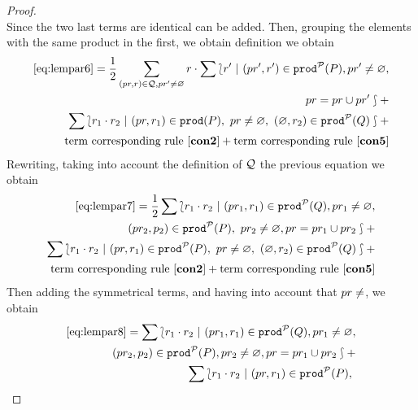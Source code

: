 \begin{proof}
\begin{equation}
    \end{equation}
    Since the two last terms are identical can be added. Then,
    grouping the elements with the same product in the first, we obtain
    definition we obtain
    \begin{equation}\label{eq:lempar7}
      \begin{split}
        \eqref{eq:lempar6} =
        \frac{1}{2}\sum_{(pr,r)\in{\cal Q}, pr'\neq\varnothing} r\cdot
        \sum\lbag r'\ |\
        (pr', r')\in\mathtt{prod}^{\cal P}(P), pr'\neq\varnothing,\\
        pr=pr\cup pr'\rbag +\\
        \sum\lbag  r_{1}\cdot r_{2}\ |\
        (pr,r_{1})\in\mathtt{prod}(P),\ pr\neq\varnothing,\
        (\varnothing, r_{2})\in \mathtt{prod}^{\cal P}(Q)\rbag+\\
        \mbox{term corresponding rule \ensuremath{\mathbf{[con2]}}} + \mbox{term corresponding rule \ensuremath{\mathbf{[con5]}}}
      \end{split}
    \end{equation}
    Rewriting, taking into account the definition of \({\cal Q}\) the
    previous equation we obtain
    \begin{equation}\label{eq:lempar8}
      \begin{split}
        \eqref{eq:lempar7} =
        \frac{1}{2}\sum\lbag r_{1}\cdot r_{2}\ |\ (pr_{1},r_{1})\in\prodp(Q),
        pr_{1}\neq\emptyset,\\ (pr_{2},p_{2})\in\prodp(P),\
        pr_{2}\neq\emptyset,pr = pr_{1}\cup pr_{2}\rbag +\\
        \sum\lbag  r_{1}\cdot r_{2}\ |\
        (pr,r_{1})\in\prodp(P),\ pr\neq\emptyset,\
        (\emptyset,r_{2})\in\prodp(Q)\rbag+\\
        \mbox{term corresponding rule \nombreRegla{con2}} + \mbox{term corresponding rule \nombreRegla{con5}}
      \end{split}
    \end{equation}
    Then adding the symmetrical terms, and having into account that
    $pr\neq\empty$, we obtain
    \begin{equation}\label{eq:lempar9}
      \begin{split}
        \eqref{eq:lempar8} =
        \sum\lbag r_{1}\cdot r_{2}\ |\ (pr_{1},r_{1})\in\prodp(Q),
        pr_{1}\neq\emptyset,\\ (pr_{2},p_{2})\in\prodp(P),
        pr_{2}\neq\emptyset, pr = pr_{1}\cup pr_{2}\rbag +\\
        \sum\lbag  r_{1}\cdot r_{2}\ |\
        (pr,r_{1})\in\prodp(P),\

\end{split}
\end{equation}
\end{proof}
